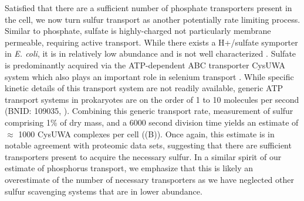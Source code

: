 Satisfied that there are a sufficient number of phosphate transporters
present in the cell, we now turn sulfur transport as another potentially rate
limiting process. Similar to phosphate, sulfate is highly-charged
not particularly membrane permeable, requiring active
transport. While there exists a H+/sulfate symporter in \textit{E.
coli}, it is in relatively low abundance and is not well characterized
\citep{zhang2014}. Sulfate is predominantly acquired via the ATP-dependent ABC
transporter CysUWA system which also plays an important role in selenium
transport \citep{sekowska2000, sirko1995}. While specific kinetic details of
this transport system are not readily available, generic ATP transport
systems in prokaryotes are on the order of 1 to 10 molecules per second
(BNID: 109035, \cite{milo2010}). Combining this generic
transport rate, measurement of sulfur comprising 1\% of dry mass, and a 6000
second division time yields an estimate of $\approx$ 1000 CysUWA
complexes per cell ((B)). Once again, this estimate
is in notable agreement with proteomic data sets, suggesting that there are
sufficient transporters present to acquire the necessary sulfur. In a similar
spirit of our estimate of phosphorus transport, we emphasize that this is
likely an overestimate of the number of necessary transporters as we have
neglected other sulfur scavenging systems that are in lower
abundance.


\begin{figure}
    \begin{fullwidth}
    \end{fullwidth}
\end{figure}


